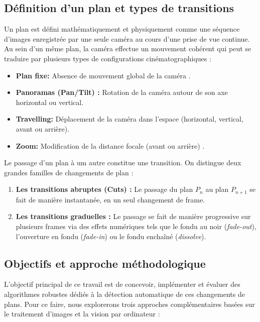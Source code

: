 \documentclass[11pt,a4paper]{article}
\begin{document}
        \subsection*{Définition d'un plan et types de transitions}
        
            Un plan est défini mathématiquement et physiquement comme une séquence d'images enregistrée par une seule caméra au cours d'une prise de vue continue. Au sein d'un même plan, la caméra effectue un mouvement cohérent qui peut se traduire par plusieurs types de configurations cinématographiques  :
            
            \begin{itemize}
                \item \textbf{Plan fixe:} Absence de mouvement global de la caméra .
                \item \textbf{Panoramas (Pan/Tilt) :} Rotation de la caméra autour de son axe horizontal ou vertical.
                \item \textbf{Travelling:} Déplacement de la caméra dans l'espace (horizontal, vertical, avant ou arrière).
                \item \textbf{Zoom:} Modification de la distance focale (avant ou arrière) .
            \end{itemize}
            
            Le passage d'un plan à um autre constitue une transition. On distingue deux grandes familles de changements de plan :
            \begin{enumerate}
            \item \textbf{Les transitions abruptes (Cuts) :} Le passage du plan $P_n$ au plan $P_{n+1}$ se fait de manière instantanée, en un seul changement de frame.
            \item \textbf{Les transitions graduelles :} Le passage se fait de manière progressive sur plusieurs frames via des effets numériques tels que le fondu au noir (\textit{fade-out}), l'ouverture en fondu (\textit{fade-in}) ou le fondu enchaîné (\textit{dissolve}).
            \end{enumerate}
            
        \subsection*{Objectifs et approche méthodologique}
        
            L'objectif principal de ce travail est de concevoir, implémenter et évaluer des algorithmes robustes dédiés à la détection automatique de ces changements de plans. Pour ce faire, nous explorerons trois approches complémentaires basées sur le traitement d'images et la vision par ordinateur :
            
\end{document}
